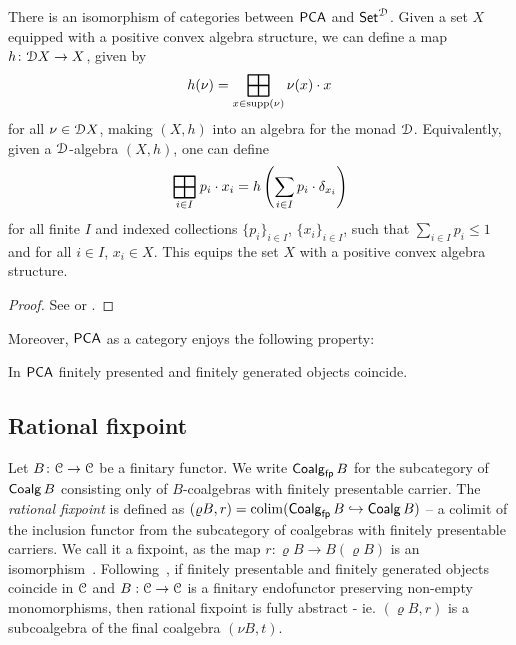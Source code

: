 \begin{theorem}\label{c4:thm:correspondence}
	There is an isomorphism of categories between ${\mathsf{PCA}}$ and ${\mathsf{Set}}^{\mathcal{D}}$. Given a set $X$ equipped with a positive convex algebra structure, we can define a map $h \colon \mathcal{D} X \to X$, given by 
	$$
		h(\nu) = \bigboxplus_{x \in \supp(\nu)} \nu(x) \cdot x
	$$
	for all $\nu \in \mathcal{D} X$, making $(X, h)$ into an algebra for the monad $\mathcal{D}$. Equivalently, given a $\mathcal{D}$-algebra $(X, h)$, one can define 
	$$
		\bigboxplus_{i \in I} p_i \cdot x_i = h \left(\sum_{i \in I} p_i \cdot \delta_{x_i}\right)
	$$
	for all finite $I$ and indexed collections $\{p_i\}_{i \in I}$, $\{x_i\}_{i \in I}$, such that $\sum_{i \in I} p_i \leq 1$ and for all $i \in I$, $x_i \in X$. This equips the set $X$ with a positive convex algebra structure.  
	\end{theorem}
	\begin{proof}
		See \cite[Theorem~4]{Jacobs:2010:Convexity} or \cite[Proposition~5.3]{Doberkat:2008:Erratum}.
	\end{proof}
	Moreover, ${\mathsf{PCA}}$ as a category enjoys the following property: 
	\begin{theorem}
		In ${\mathsf{PCA}}$ finitely presented and finitely generated objects coincide.
	\end{theorem}
	\subsection{Rational fixpoint}
	Let $B \colon \mathcal{C} \to \mathcal{C}$ be a finitary functor. We write $\mathop{\mathsf{Coalg}_{\mathsf{fp}}}{B}$ for the subcategory of $\mathop{\mathsf{Coalg}}{B}$ consisting only of $B$-coalgebras with finitely presentable carrier. The \emph{rational fixpoint} is defined as $(\varrho B,r) = \mathop{\mathrm{colim}}(\mathop{\mathsf{Coalg}_{\mathsf{fp}}}{B} \hookrightarrow \mathop{\mathsf{Coalg}}{B})$ -- a colimit of the inclusion functor from the subcategory of coalgebras with finitely presentable carriers. We call it a fixpoint, as the map $r \colon \varrho B \to B (\varrho B) $ is an isomorphism~\cite{Adamek:2006:Iterative}. 
Following~{\cite[Corollary~3.10, Theorem~3.12]{Milius:2020:New}}, if finitely presentable and finitely generated objects coincide in $\mathcal{C}$ and $B : \mathcal{C} \to \mathcal{C}$ is a finitary endofunctor preserving non-empty monomorphisms, then rational fixpoint is fully abstract - ie. $(\varrho B, r)$ is a subcoalgebra of the final coalgebra $(\nu B, t)$.

